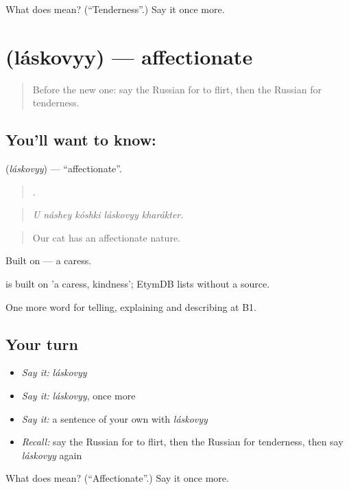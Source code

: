 \begin{tcolorbox}[breakable,colback=teal!4,colframe=teal!35!black,title={Before you move on}]
What does  mean? (\textquotedblleft{}Tenderness\textquotedblright{}.) Say it once more.
\end{tcolorbox}
\section[\texorpdfstring{\ru{ласковый} (láskovyy)}{ласковый (láskovyy)}]{ (láskovyy) — affectionate}

\label{lesson:RU-C493-laskovyy}



\begin{quote}
Before the new one: say the Russian for to flirt, then the Russian for tenderness.
\end{quote}

\subsection*{You'll want to know: }
\textbf{} (\emph{láskovyy}) — \textquotedblleft{}affectionate\textquotedblright{}.

\begin{quote}
    .
\end{quote}

\begin{quote}
\emph{U náshey kóshki láskovyy kharákter.}
\end{quote}

\begin{quote}
Our cat has an affectionate nature.
\end{quote}

Built on \emph{} — a caress.

\begin{cousinweb}
\emph{} is built on \emph{} 'a caress, kindness'; EtymDB lists \emph{} without a source.
\end{cousinweb}

\begin{grammarlens}[title={What you've built}]
One more word for telling, explaining and describing at B1.
\end{grammarlens}

\subsection*{Your turn}
\begin{itemize}
\raggedright
  \item \emph{Say it:} \emph{láskovyy}
  \item \emph{Say it:} \emph{láskovyy}, once more
  \item \emph{Say it:} a sentence of your own with \emph{láskovyy}
  \item \emph{Recall:} say the Russian for to flirt, then the Russian for tenderness, then say \emph{láskovyy} again
\end{itemize}

\begin{tcolorbox}[breakable,colback=teal!4,colframe=teal!35!black,title={Before you move on}]
What does  mean? (\textquotedblleft{}Affectionate\textquotedblright{}.) Say it once more.
\end{tcolorbox}
